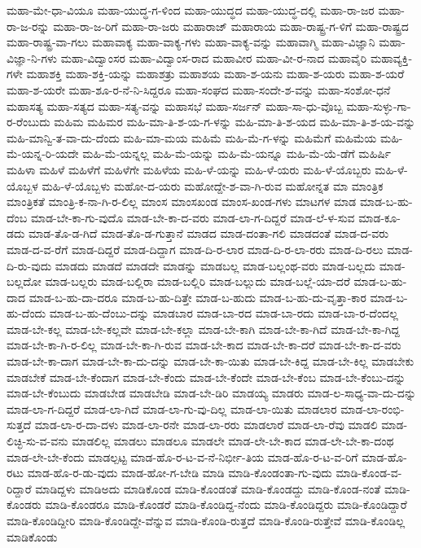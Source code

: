 {ಮಹಾ-ಮೇ-ಧಾ-ವಿಯೂ
ಮಹಾ-ಯುದ್ಧ-ಗ-ಳಿಂದ
ಮಹಾ-ಯುದ್ಧದ
ಮಹಾ-ಯುದ್ಧ-ದಲ್ಲಿ
ಮಹಾ-ರಾ-ಜರ
ಮಹಾ-ರಾ-ಜ-ರನ್ನು
ಮಹಾ-ರಾ-ಜ-ರಿಗೆ
ಮಹಾ-ರಾ-ಜರು
ಮಹಾರಾಜ್
ಮಹಾರಾಯ
ಮಹಾ-ರಾಷ್ಟ್ರ-ಗ-ಳಿಗೆ
ಮಹಾ-ರಾಷ್ಟ್ರದ
ಮಹಾ-ರಾಷ್ಟ್ರ-ವಾ-ಗಲು
ಮಹಾವಾಕ್ಯ
ಮಹಾ-ವಾಕ್ಯ-ಗಳು
ಮಹಾ-ವಾಕ್ಯ-ವನ್ನು
ಮಹಾವಾಗ್ಮಿ
ಮಹಾ-ವಿಜ್ಞಾನಿ
ಮಹಾ-ವಿಜ್ಞಾ-ನಿ-ಗಳು
ಮಹಾ-ವಿದ್ವಾಂಸರ
ಮಹಾ-ವಿದ್ವಾಂಸ-ರಾದ
ಮಹಾವೀರ
ಮಹಾ-ವೀ-ರ-ನಾದ
ಮಹಾವೈರಿ
ಮಹಾವ್ಯಕ್ತಿ-ಗಳೇ
ಮಹಾಶಕ್ತಿ
ಮಹಾ-ಶಕ್ತಿ-ಯನ್ನು
ಮಹಾಶತ್ರು
ಮಹಾಶಯ
ಮಹಾ-ಶ-ಯನು
ಮಹಾ-ಶ-ಯರು
ಮಹಾ-ಶ-ಯರೆ
ಮಹಾ-ಶ-ಯರೇ
ಮಹಾ-ಶೂ-ರ-ನೆ-ನಿ-ಸಿದ್ದರೂ
ಮಹಾ-ಸಂಘದ
ಮಹಾ-ಸಂದೇ-ಶ-ವನ್ನು
ಮಹಾ-ಸಂಶೋ-ಧನೆ
ಮಹಾಸತ್ಯ
ಮಹಾ-ಸತ್ಯದ
ಮಹಾ-ಸತ್ಯ-ವನ್ನು
ಮಹಾಸಭೆ
ಮಹಾ-ಸರ್ಜನ್
ಮಹಾ-ಸಾ-ಧು-ವೊಬ್ಬ
ಮಹಾ-ಸುಳ್ಳು-ಗಾ-ರ-ರೆಂಬುದು
ಮಹಿಮ
ಮಹಿಮರ
ಮಹಿ-ಮಾ-ತಿ-ಶ-ಯ-ಗ-ಳನ್ನು
ಮಹಿ-ಮಾ-ತಿ-ಶ-ಯದ
ಮಹಿ-ಮಾ-ತಿ-ಶ-ಯ-ವನ್ನು
ಮಹಿ-ಮಾನ್ವಿ-ತ-ವಾ-ದು-ದೆಂದು
ಮಹಿ-ಮಾ-ಮಯ
ಮಹಿಮೆ
ಮಹಿ-ಮೆ-ಗ-ಳನ್ನು
ಮಹಿಮೆಗೆ
ಮಹಿಮೆಯ
ಮಹಿ-ಮೆ-ಯನ್ನ-ರಿ-ಯದೇ
ಮಹಿ-ಮೆ-ಯನ್ನಲ್ಲ
ಮಹಿ-ಮೆ-ಯನ್ನು
ಮಹಿ-ಮೆ-ಯನ್ನೂ
ಮಹಿ-ಮೆ-ಯೆ-ಡೆಗೆ
ಮಹಿರ್ಷಿ
ಮಹಿಳಾ
ಮಹಿಳೆ
ಮಹಿಳೆಗೆ
ಮಹಿಳೆಗೇ
ಮಹಿಳೆಯ
ಮಹಿ-ಳೆ-ಯನ್ನು
ಮಹಿ-ಳೆ-ಯರು
ಮಹಿ-ಳೆ-ಯೊಬ್ಬರು
ಮಹಿ-ಳೆ-ಯೊಬ್ಬಳ
ಮಹಿ-ಳೆ-ಯೊಬ್ಬಳು
ಮಹೋ-ದ-ಯರು
ಮಹೋದ್ದೇ-ಶ-ವಾ-ಗಿ-ರುವ
ಮಹೋನ್ನತ
ಮಾ
ಮಾಂತ್ರಿಕ
ಮಾಂತ್ರಿಕತೆ
ಮಾಂತ್ರಿ-ಕ-ನಾ-ಗಿ-ರ-ಲಿಲ್ಲ
ಮಾಂಸ
ಮಾಂಸಖಂಡ
ಮಾಂಸ-ಖಂಡ-ಗಳು
ಮಾಟಗಳ
ಮಾಡ
ಮಾಡ-ಬ-ಹು-ದೆಂಬ
ಮಾಡ-ಬೇ-ಕಾ-ಗು-ವುದೊ
ಮಾಡ-ಬೇ-ಕಾ-ದ-ವರು
ಮಾಡ-ಲಾ-ಗ-ದಿದ್ದರೆ
ಮಾಡ-ಲೆ-ಳ-ಸುವ
ಮಾಡ-ಕೂ-ಡದು
ಮಾಡ-ತೊ-ಡ-ಗಿದೆ
ಮಾಡ-ತೊ-ಡ-ಗುತ್ತಾನೆ
ಮಾಡದ
ಮಾಡ-ದಂತಾ-ಗಲಿ
ಮಾಡದಂತೆ
ಮಾಡ-ದ-ವರು
ಮಾಡ-ದ-ವ-ರೆಗೆ
ಮಾಡ-ದಿದ್ದರೆ
ಮಾಡ-ದಿದ್ದಾಗ
ಮಾಡ-ದಿ-ರ-ಲಾರ
ಮಾಡ-ದಿ-ರ-ಲಾ-ರರು
ಮಾಡ-ದಿ-ರಲು
ಮಾಡ-ದಿ-ರು-ವುದು
ಮಾಡದು
ಮಾಡದೆ
ಮಾಡದೇ
ಮಾಡನ್ನು
ಮಾಡಬಲ್ಲ
ಮಾಡ-ಬಲ್ಲಂಥ-ವರು
ಮಾಡ-ಬಲ್ಲದು
ಮಾಡ-ಬಲ್ಲದೋ
ಮಾಡ-ಬಲ್ಲರು
ಮಾಡ-ಬಲ್ಲಿರಾ
ಮಾಡ-ಬಲ್ಲಿರಿ
ಮಾಡ-ಬಲ್ಲುದು
ಮಾಡ-ಬಲ್ಲೆ-ಯಾ-ದರೆ
ಮಾಡ-ಬ-ಹು-ದಾದ
ಮಾಡ-ಬ-ಹು-ದಾ-ದರೂ
ಮಾಡ-ಬ-ಹು-ದಿತ್ತೇ
ಮಾಡ-ಬ-ಹುದು
ಮಾಡ-ಬ-ಹು-ದು-ವೃತ್ತಾ-ಕಾರ
ಮಾಡ-ಬ-ಹು-ದೆಂದು
ಮಾಡ-ಬ-ಹು-ದೆಂಬು-ದನ್ನು
ಮಾಡಬಾರ
ಮಾಡ-ಬಾ-ರದ
ಮಾಡ-ಬಾ-ರದು
ಮಾಡ-ಬಾ-ರ-ದೆಂದಲ್ಲ
ಮಾಡ-ಬೇ-ಕಲ್ಲ
ಮಾಡ-ಬೇ-ಕಲ್ಲವೇ
ಮಾಡ-ಬೇ-ಕಲ್ಲಾ
ಮಾಡ-ಬೇ-ಕಾಗಿ
ಮಾಡ-ಬೇ-ಕಾ-ಗಿದೆ
ಮಾಡ-ಬೇ-ಕಾ-ಗಿದ್ದ
ಮಾಡ-ಬೇ-ಕಾ-ಗಿ-ರ-ಲಿಲ್ಲ
ಮಾಡ-ಬೇ-ಕಾ-ಗಿ-ರುವ
ಮಾಡ-ಬೇ-ಕಾದ
ಮಾಡ-ಬೇ-ಕಾ-ದರೆ
ಮಾಡ-ಬೇ-ಕಾ-ದ-ವರು
ಮಾಡ-ಬೇ-ಕಾ-ದಾಗ
ಮಾಡ-ಬೇ-ಕಾ-ದು-ದನ್ನು
ಮಾಡ-ಬೇ-ಕಾ-ಯಿತು
ಮಾಡ-ಬೇ-ಕಿದ್ದ
ಮಾಡ-ಬೇ-ಕಿಲ್ಲ
ಮಾಡಬೇಕು
ಮಾಡಬೇಕೆ
ಮಾಡ-ಬೇ-ಕೆಂದಾಗ
ಮಾಡ-ಬೇ-ಕೆಂದು
ಮಾಡ-ಬೇ-ಕೆಂದೇ
ಮಾಡ-ಬೇ-ಕೆಂಬ
ಮಾಡ-ಬೇ-ಕೆಂಬು-ದನ್ನು
ಮಾಡ-ಬೇ-ಕೆಂಬುದು
ಮಾಡಬೇಡ
ಮಾಡಬೇಡಿ
ಮಾಡ-ಬೇ-ಡಿರಿ
ಮಾಡಯ್ಯ
ಮಾಡರು
ಮಾಡ-ಲ-ಸಾಧ್ಯ-ವಾ-ದು-ದನ್ನು
ಮಾಡ-ಲಾ-ಗ-ದಿದ್ದರೆ
ಮಾಡ-ಲಾ-ಗಿದೆ
ಮಾಡ-ಲಾ-ಗು-ವು-ದಿಲ್ಲ
ಮಾಡ-ಲಾ-ಯಿತು
ಮಾಡಲಾರ
ಮಾಡ-ಲಾ-ರಂಭಿ-ಸುತ್ತದೆ
ಮಾಡ-ಲಾ-ರ-ದಾ-ದಳು
ಮಾಡ-ಲಾ-ರನೇ
ಮಾಡ-ಲಾ-ರರು
ಮಾಡಲಾರೆ
ಮಾಡ-ಲಾ-ರೆವು
ಮಾಡಲಿ
ಮಾಡ-ಲಿಚ್ಛಿ-ಸು-ವ-ವನು
ಮಾಡಲಿಲ್ಲ
ಮಾಡಲು
ಮಾಡಲೂ
ಮಾಡಲೇ
ಮಾಡ-ಲೇ-ಬೇ-ಕಾದ
ಮಾಡ-ಲೇ-ಬೇ-ಕಾ-ದಂಥ
ಮಾಡ-ಲೇ-ಬೇ-ಕೆಂದು
ಮಾಡಲ್ಪಟ್ಟ
ಮಾಡ-ಹೊ-ರ-ಟ-ವ-ನೆ-ನಿರ್ಭೀ-ತಿಯ
ಮಾಡ-ಹೊ-ರ-ಟ-ವ-ರಿಗೆ
ಮಾಡ-ಹೊ-ರಟು
ಮಾಡ-ಹೊ-ರ-ಡು-ವುದು
ಮಾಡ-ಹೋ-ಗ-ಬೇಡಿ
ಮಾಡಿ
ಮಾಡಿ-ಕೊಂಡಂತಾ-ಗು-ವುದು
ಮಾಡಿ-ಕೊಂಡ-ವ-ರಿದ್ದಾರೆ
ಮಾಡಿದ್ದಳು
ಮಾಡಿಅದು
ಮಾಡಿಕೊಂಡ
ಮಾಡಿ-ಕೊಂಡಂತೆ
ಮಾಡಿ-ಕೊಂಡದ್ದು
ಮಾಡಿ-ಕೊಂಡ-ನಂತೆ
ಮಾಡಿ-ಕೊಂಡರು
ಮಾಡಿ-ಕೊಂಡರೂ
ಮಾಡಿ-ಕೊಂಡರೆ
ಮಾಡಿ-ಕೊಂಡಿದ್ದ-ನೆಂದು
ಮಾಡಿ-ಕೊಂಡಿದ್ದರು
ಮಾಡಿ-ಕೊಂಡಿದ್ದಾರೆ
ಮಾಡಿ-ಕೊಂಡಿದ್ದೀರಿ
ಮಾಡಿ-ಕೊಂಡಿದ್ದೇ-ವೆನ್ನುವ
ಮಾಡಿ-ಕೊಂಡಿ-ರುತ್ತದೆ
ಮಾಡಿ-ಕೊಂಡಿ-ರುತ್ತೇವೆ
ಮಾಡಿ-ಕೊಂಡಿಲ್ಲ
ಮಾಡಿಕೊಂಡು
}
